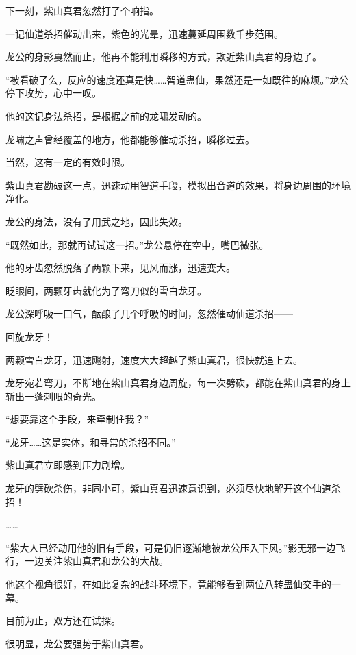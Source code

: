 
\begin{this_body}



下一刻，紫山真君忽然打了个响指。

一记仙道杀招催动出来，紫色的光晕，迅速蔓延周围数千步范围。

龙公的身影戛然而止，他再不能利用瞬移的方式，欺近紫山真君的身边了。

“被看破了么，反应的速度还真是快……智道蛊仙，果然还是一如既往的麻烦。”龙公停下攻势，心中一叹。

他的这记身法杀招，是根据之前的龙啸发动的。

龙啸之声曾经覆盖的地方，他都能够催动杀招，瞬移过去。

当然，这有一定的有效时限。

紫山真君勘破这一点，迅速动用智道手段，模拟出音道的效果，将身边周围的环境净化。

龙公的身法，没有了用武之地，因此失效。

“既然如此，那就再试试这一招。”龙公悬停在空中，嘴巴微张。

他的牙齿忽然脱落了两颗下来，见风而涨，迅速变大。

眨眼间，两颗牙齿就化为了弯刀似的雪白龙牙。

龙公深呼吸一口气，酝酿了几个呼吸的时间，忽然催动仙道杀招——

回旋龙牙！

两颗雪白龙牙，迅速飚射，速度大大超越了紫山真君，很快就追上去。

龙牙宛若弯刀，不断地在紫山真君身边周旋，每一次劈砍，都能在紫山真君的身上斩出一蓬刺眼的奇光。

“想要靠这个手段，来牵制住我？”

“龙牙……这是实体，和寻常的杀招不同。”

紫山真君立即感到压力剧增。

龙牙的劈砍杀伤，非同小可，紫山真君迅速意识到，必须尽快地解开这个仙道杀招！

……

“紫大人已经动用他的旧有手段，可是仍旧逐渐地被龙公压入下风。”影无邪一边飞行，一边关注紫山真君和龙公的大战。

他这个视角很好，在如此复杂的战斗环境下，竟能够看到两位八转蛊仙交手的一幕。

目前为止，双方还在试探。

很明显，龙公要强势于紫山真君。


\end{this_body}
